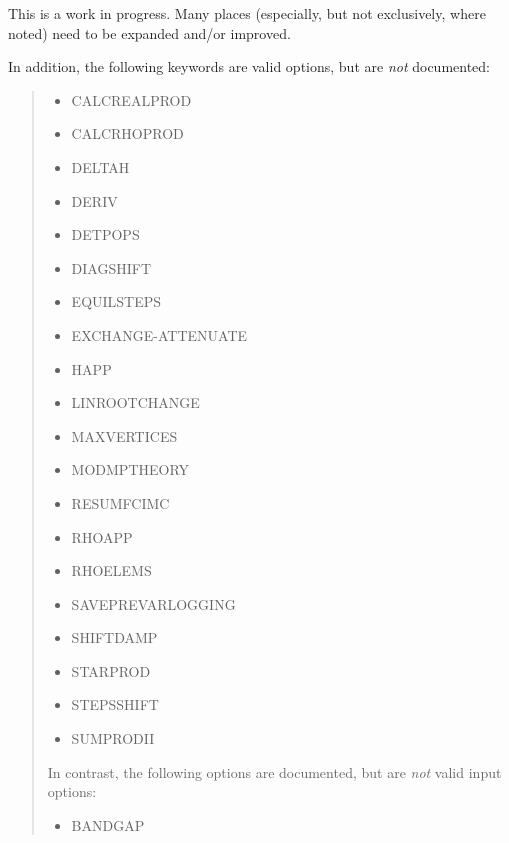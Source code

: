 \documentclass[openany,a4paper,10pt]{manual}
\begin{document}
\begin{notice}[warning]
This is a work in progress.  Many places (especially, but not
exclusively, where noted) need to be expanded and/or improved.

In addition, the following keywords are valid options, but are
\emph{not} documented:
\begin{quote}
\begin{itemize}
\item {} 
CALCREALPROD

\item {} 
CALCRHOPROD

\item {} 
DELTAH

\item {} 
DERIV

\item {} 
DETPOPS

\item {} 
DIAGSHIFT

\item {} 
EQUILSTEPS

\item {} 
EXCHANGE-ATTENUATE

\item {} 
HAPP

\item {} 
LINROOTCHANGE

\item {} 
MAXVERTICES

\item {} 
MODMPTHEORY

\item {} 
RESUMFCIMC

\item {} 
RHOAPP

\item {} 
RHOELEMS

\item {} 
SAVEPREVARLOGGING

\item {} 
SHIFTDAMP

\item {} 
STARPROD

\item {} 
STEPSSHIFT

\item {} 
SUMPRODII

\end{itemize}

In contrast, the following options are documented, but are \emph{not} valid
input options:
\begin{itemize}
\item {} 
BANDGAP


\end{itemize}
\end{quote}
\end{notice}
\end{document}
